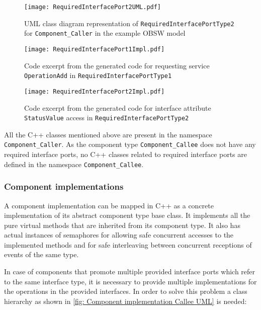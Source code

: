 \begin{figure}[h]
	\centering
	\texttt{[image: RequiredInterfacePort2UML.pdf]}
	\caption{UML class diagram representation of \texttt{Required\allowbreak InterfacePort\allowbreak Type2} for \texttt{Component\allowbreak\_Caller} in the example OBSW model}
	\label{fig: Required interface port2 UML}
\end{figure}

\begin{figure}[h]
	\centering
	\texttt{[image: RequiredInterfacePort1Impl.pdf]}
	\caption{Code excerpt from the generated code for requesting service \texttt{OperationAdd} in \texttt{Required\allowbreak InterfacePort\allowbreak Type1}}
	\label{fig: Required interface port1 Impl}
\end{figure}

\begin{figure}[h]
	\centering
	\texttt{[image: RequiredInterfacePort2Impl.pdf]}
	\caption{Code excerpt from the generated code for interface attribute \texttt{StatusValue} access in \texttt{Required\allowbreak InterfacePort\allowbreak Type2}}
	\label{fig: Required interface port2 Impl}
\end{figure}

All the C++ classes mentioned above are present in the namespace \texttt{Component\allowbreak\_Caller}. As the component type \texttt{Component\allowbreak\_Callee} does not have any required interface ports, no C++ classes related to required interface ports are defined in the namespace \texttt{Component\allowbreak\_Callee}. 

\subsubsection{\textbf{Component implementations}}
A component implementation can be mapped in C++ as a concrete implementation of its abstract component type base class. It implements all the pure virtual methods that are inherited from its component type. It also has actual instances of semaphores for allowing safe concurrent accesses to the implemented methods and for safe interleaving between concurrent receptions of events of the same type.

In case of components that promote multiple provided interface ports which refer to the same interface type, it is necessary to provide multiple implementations for the operations in the provided interfaces. In order to solve this problem a class hierarchy as shown in \cref{fig: Component implementation Callee UML} is needed:

